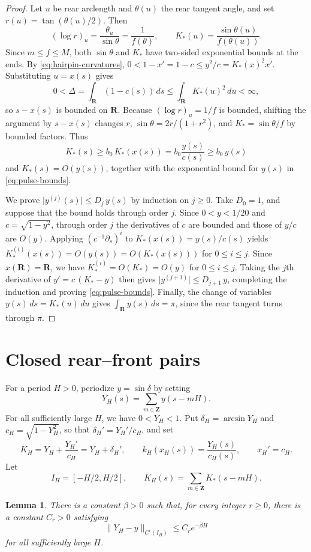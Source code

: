 \documentclass[11pt]{article}
\numberwithin{equation}{section}
\newtheorem{lemma}[theorem]{Lemma}
\newcommand{\R}{\mathbf{R}}
\newcommand{\Z}{\mathbf{Z}}
\newcommand{\abs}[1]{\lvert #1\rvert}
\newcommand{\norm}[1]{\lVert #1\rVert}
\begin{document}
\begin{proof}
Let \(u\) be rear arclength and \(\theta(u)\) the rear tangent angle, and set
\(r(u)=\tan(\theta(u)/2)\). Then
\[
  (\log r)_u=\frac{\theta_u}{\sin\theta}=\frac1{f(\theta)},
  \qquad K_*(u)=\frac{\sin\theta(u)}{f(\theta(u))}.
\]
Since \(m\leq f\leq M\), both \(\sin\theta\) and \(K_*\) have two-sided
exponential bounds at the ends. By \eqref{eq:hairpin-curvatures},
\(0<1-x'=1-c\leq y^2/c=K_*(x)^2x'\). Substituting \(u=x(s)\) gives
\[
  0<\Delta=\int_\R(1-c(s))\,ds\leq\int_\R K_*(u)^2\,du<\infty,
\]
so \(s-x(s)\) is bounded on \(\R\). Because \((\log r)_u=1/f\) is bounded,
shifting the argument by \(s-x(s)\) changes \(r\),
\(\sin\theta=2r/(1+r^2)\), and \(K_*=\sin\theta/f\) by bounded factors. Thus
\[
  K_*(s)\geq b_0\,K_*(x(s))=b_0\frac{y(s)}{c(s)}\geq b_0\,y(s)
\]
and \(K_*(s)=O(y(s))\), together with the exponential bound for \(y(s)\) in
\eqref{eq:pulse-bounds}.

We prove \(\abs{y^{(j)}(s)}\leq D_j\,y(s)\) by induction on \(j\geq0\).
Take \(D_0=1\), and suppose that the bound holds through order \(j\).
Since \(0<y<1/20\) and \(c=\sqrt{1-y^2}\), through order \(j\) the
derivatives of \(c\) are bounded and those of \(y/c\) are \(O(y)\).
Applying \((c^{-1}\partial_s)^i\) to \(K_*(x(s))=y(s)/c(s)\) yields
\(K_*^{(i)}(x(s))=O(y(s))=O(K_*(x(s)))\) for \(0\leq i\leq j\).
Since \(x(\R)=\R\), we have \(K_*^{(i)}=O(K_*)=O(y)\) for
\(0\leq i\leq j\). Taking the \(j\)th derivative of \(y'=c\,(K_*-y)\)
then gives \(\abs{y^{(j+1)}}\leq D_{j+1}\,y\), completing the induction and
proving \eqref{eq:pulse-bounds}. Finally, the change of variables
\(y(s)\,ds=K_*(u)\,du\) gives \(\int_\R y(s)\,ds=\pi\), since the rear
tangent turns through \(\pi\).
\end{proof}

\section{Closed rear--front pairs}\label{sec:pairs}

For a period \(H>0\), periodize \(y=\sin\delta\) by setting
\[
  Y_H(s)=\sum_{m\in\Z}y(s-mH).
\]
For all sufficiently large \(H\), we have \(0<Y_H<1\). Put
\(\delta_H=\arcsin Y_H\) and \(c_H=\sqrt{1-Y_H^2}\), so that
\(\delta_H'=Y_H'/c_H\), and set
\[
  K_H=Y_H+\frac{Y_H'}{c_H}=Y_H+\delta_H',\qquad
  k_H(x_H(s))=\frac{Y_H(s)}{c_H(s)},\qquad x_H'=c_H.
\]
Let
\[
  I_H=[-H/2,H/2],\qquad
  \overline K_H(s)=\sum_{m\in\Z}K_*(s-mH).
\]

\begin{lemma}\label{lem:periodization}
There is a constant \(\beta>0\) such that, for every integer \(r\geq0\), there
is a constant \(C_r>0\) satisfying
\begin{equation}\label{eq:periodization}
  \norm{Y_H-y}_{C^r(I_H)}
  \leq C_re^{-\beta H}
\end{equation}
for all sufficiently large \(H\).
\end{lemma}
\end{document}
